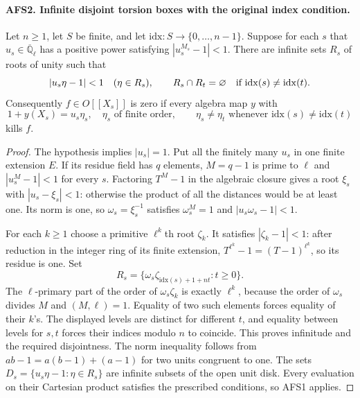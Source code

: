 \documentclass[11pt,a4paper]{article}
\numberwithin{equation}{section}
\theoremstyle{remark}\newtheorem{remark}[theorem]{Remark}
\begin{document}
\paragraph{AFS2. Infinite disjoint torsion boxes with the original index condition.}
\label{claim:AFS2}
Let $n\geq1$, let $S$ be finite, and let
$\mathrm{idx}:S\to\{0,\ldots,n-1\}$.  Suppose for each $s$ that
$u_s\in\overline{\mathbb Q}_\ell$ has a positive power
satisfying $|u_s^{M_s}-1|<1$.  There are infinite sets $R_s$ of
roots of unity such that
\[
 |u_s\eta-1|<1\quad(\eta\in R_s),\qquad
 R_s\cap R_t=\varnothing\quad\hbox{if }\mathrm{idx}(s)\ne\mathrm{idx}(t).
\]
Consequently $f\in O[[X_s]]$ is zero if every algebra map $y$
with
\[
 1+y(X_s)=u_s\eta_s,
 \quad\eta_s\text{ of finite order},\qquad
 \eta_s\ne\eta_t\text{ whenever }\mathrm{idx}(s)\ne\mathrm{idx}(t)
\]
kills $f$.
\begin{proof}
The hypothesis implies $|u_s|=1$.  Put all the finitely many $u_s$
in one finite extension $E$.  If its residue field has $q$ elements,
$M=q-1$ is prime to $\ell$ and $|u_s^M-1|<1$ for every $s$.
Factoring $T^M-1$ in the algebraic closure gives a root $\xi_s$
with $|u_s-\xi_s|<1$: otherwise the product of all the distances
would be at least one.  Its norm is one, so
$\omega_s=\xi_s^{-1}$ satisfies
$\omega_s^M=1$ and $|u_s\omega_s-1|<1$.

For each $k\geq1$ choose a primitive $\ell^k$th root $\zeta_k$.
It satisfies $|\zeta_k-1|<1$: after reduction in the integer ring
of its finite extension, $T^{\ell^k}-1=(T-1)^{\ell^k}$, so its
residue is one.  Set
\[
 R_s=\{\omega_s\zeta_{\mathrm{idx}(s)+1+nt}:t\geq0\}.
\]
The $\ell$-primary part of the order of
$\omega_s\zeta_k$ is exactly $\ell^k$, because the order of
$\omega_s$ divides $M$ and $(M,\ell)=1$.  Equality of two such
elements forces equality of their $k$'s.  The displayed levels
are distinct for different $t$, and equality between levels for
$s,t$ forces their indices modulo $n$ to coincide.  This proves
infinitude and the required disjointness.  The norm inequality
follows from
$ab-1=a(b-1)+(a-1)$ for two units congruent to one.
The sets $D_s=\{u_s\eta-1:\eta\in R_s\}$ are infinite subsets
of the open unit disk.  Every evaluation on their Cartesian
product satisfies the prescribed conditions, so AFS1 applies.
\end{proof}

\end{document}
